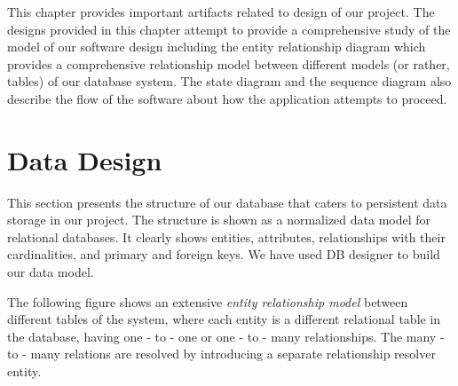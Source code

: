 
This chapter provides important artifacts related to design of our project. The designs provided in this chapter attempt to provide a comprehensive study of the model of our software design including the entity relationship diagram which provides a  comprehensive relationship model between different models (or rather, tables) of our database system. The state diagram and the sequence diagram also describe the flow of the software about how the application attempts to proceed. 


\section{Data Design}

This section presents the structure of our database that caters to persistent data storage in our project. The structure is shown as a normalized data model for relational databases. It clearly shows entities, attributes, relationships with their cardinalities, and primary and foreign keys. We have used DB designer to build our data model.

The following figure shows an extensive \textit{entity relationship model} between different tables of the system, where each entity is a different relational table in the database, having one - to - one or one - to - many relationships. The many - to - many relations are resolved by introducing a separate relationship resolver entity.


